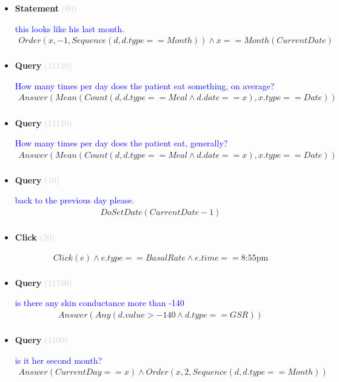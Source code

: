 \documentclass[11pt]{article}
\newcommand{\key}[1]{\textcolor{lightgray}{#1}}
\newcounter{CQuery}
\newcounter{CStatement}
\newcounter{CClick}
\begin{document}
\begin{itemize}
\item
\textbf{Statement\theCStatement} \key{(00)} \addtocounter{CStatement}{1}
\textcolor{blue}{ this looks like his last month. }
\begin{multline*}
Order(x, -1, Sequence(d, d.type==Month)) \wedge x==Month(CurrentDate) \\ 
\end{multline*}


\item
\textbf{Query\theCQuery} \key{(11110)} \addtocounter{CQuery}{1}
\textcolor{blue}{ How many times per day does the patient eat something, on average? }
\begin{multline*}
Answer(Mean(Count(d, d.type==Meal \wedge d.date==x), x.type==Date)) \\ 
\end{multline*}


\item
\textbf{Query\theCQuery} \key{(11110)} \addtocounter{CQuery}{1}
\textcolor{blue}{ How many times per day does the patient eat, generally? }
\begin{multline*}
Answer(Mean(Count(d, d.type==Meal \wedge d.date==x), x.type==Date)) \\ 
\end{multline*}


\item
\textbf{Query\theCQuery} \key{(10)} \addtocounter{CQuery}{1}
\textcolor{blue}{ back to the previous day please. }
\begin{multline*}
DoSetDate(CurrentDate - 1) \\ 
\end{multline*}


\item
\textbf{Click\theCClick} \key{(20)} \addtocounter{CClick}{1}
\textcolor{blue}{  }
\begin{multline*}
Click(e) \wedge e.type==BasalRate \wedge e.time==\mbox{8:55pm} \\ 
\end{multline*}


\item
\textbf{Query\theCQuery} \key{(11100)} \addtocounter{CQuery}{1}
\textcolor{blue}{ is there any skin conductance more than -140 }
\begin{multline*}
Answer(Any(d.value>-140 \wedge d.type==GSR)) \\ 
\end{multline*}


\item
\textbf{Query\theCQuery} \key{(1100)} \addtocounter{CQuery}{1}
\textcolor{blue}{ is it her second month? }
\begin{multline*}
Answer(CurrentDay==x) \wedge Order(x, 2, Sequence(d, d.type==Month)) \\ 
\end{multline*}



\end{itemize}
\end{document}
